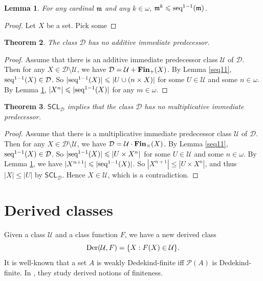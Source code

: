 \documentclass{amsart}
\newcommand{\SCL}{\ensuremath{\mathsf{SCL}}}
\newcommand{\Fin}{\textbf{\textup{Fin}}}
\newcommand{\Der}{\textup{Der}}
\newcommand{\seq}{\textup{seq}}
\renewcommand{\leq}{\leqslant}
\newcommand{\1}{\ensuremath{\mathds{1}}}
\theoremstyle{plain}
\newtheorem{thm}{Theorem}[section]
\newtheorem{lem}[thm]{Lemma}
\theoremstyle{boldrk}
\theoremstyle{definition}
\begin{document}
\begin{lem}\label{toseq11}
For any cardinal $\frak{m}$ and any $k\in\omega$, $\frak{m}^{k}\leq\seq^{1-1}(\frak{m})$.    
\end{lem}

\begin{proof}
Let $X$ be a set. Pick some     
\end{proof}

\begin{thm}
The class $\mathcal{D}$ has no additive immediate predecessor.
\end{thm}

\begin{proof}
  Assume that there is an additive immediate predecessor class $\mathcal{U}$ of $\mathcal{D}$. Then for any $X\in\mathcal{D}\setminus\mathcal{U}$, we have $\mathcal{D}=\mathcal{U}+\Fin_{+}(X)$. 
  By Lemma \ref{seq11}, $\seq^{1-1}(X)\in\mathcal{D}$.
  So $|\seq^{1-1}(X)|\leq|U\cup (n\times X)|$ for some $U\in\mathcal{U}$ and some $n\in\omega$. By Lemma \ref{toseq11}, $|X^{n}|\leq|\seq^{1-1}(X)|$ for any $m\in\omega$.   
\end{proof}



\begin{thm}
$\SCL_{\mathcal{D}}$ implies that the class $\mathcal{D}$ has no multiplicative immediate predecessor.
\end{thm}

\begin{proof}
   Assume that there is a multiplicative immediate predecessor class $\mathcal{U}$ of $\mathcal{D}$. Then for any $X\in\mathcal{D}\setminus\mathcal{U}$, we have $\mathcal{D}=\mathcal{U}\cdot\Fin_{\times}(X)$. 
  By Lemma \ref{seq11}, $\seq^{1-1}(X)\in\mathcal{D}$.
  So $|\seq^{1-1}(X)|\leq|U\times X^{n}|$ for some $U\in\mathcal{U}$ and some $n\in\omega$. By Lemma \ref{toseq11}, we have $|X^{n+1}|\leq|\seq^{1-1}(X)|$. So $|X^{n+1}|\leq |U\times X^{n}|$, and thus $|X|\leq |U|$ by $\SCL_{\mathcal{D}}$. Hence $X\in\mathcal{U}$, which is a contradiction.  
\end{proof}





\section{Derived classes}\label{s:derived}

\noindent Given a class $\mathcal{U}$ and a class function $F$, we have a new derived class $$\Der(\mathcal{U},F)=\{X:F(X)\in\mathcal{U}\}.$$
It is well-known that a set $A$ is weakly Dedekind-finite iff $\mathcal{P}(A)$ is Dedekind-finite. In \cite{Peter}, they study derived notions of finiteness.
\end{document}
